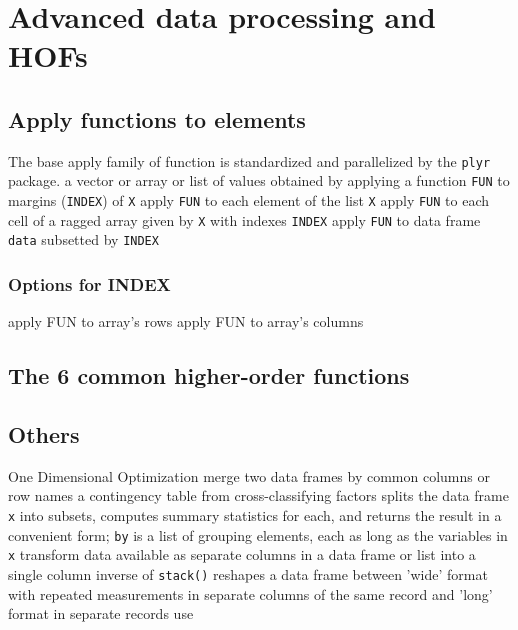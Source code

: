 \section{Advanced data processing and HOFs}{}
\subsection{Apply functions to elements}{The base apply family of function is
    standardized and parallelized by the {\tt plyr} package.}
	{a vector or array or list of values obtained by applying a function {\tt FUN} to margins ({\tt INDEX}) of {\tt X}}
	{apply {\tt FUN} to each element of the list {\tt X}}
	{apply {\tt FUN} to each cell of a ragged array given by {\tt X} with indexes {\tt INDEX}}
	{apply {\tt FUN} to data frame {\tt data} subsetted by {\tt INDEX}}
\subsubsection{Options for INDEX}
	{apply FUN to array's rows}
	{apply FUN to array's columns}

\subsection{The 6 common higher-order functions}{}

\subsection{Others}{}
	{One Dimensional Optimization}
	{merge two data frames by com\-mon col\-umns or row names}
	{a contingency table from cross-classi\-fy\-ing factors}
	{splits the data frame {\tt x} into subsets,
computes summary statistics for each, and returns the result in a convenient
form; {\tt by} is a list of grouping elements, each as long as the variables in
{\tt x}}
	{transform data available as se\-pa\-rate col\-umns in
a data frame or list into a single column}
	{inverse of {\tt stack()}}
	{reshapes a data frame between 'wide' format
    with re\-pea\-ted mea\-sure\-ments in separate
    columns of the same record and 'long' format in separate records}
	{use}

